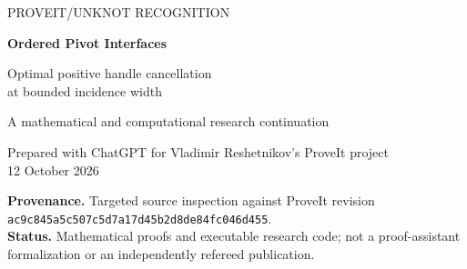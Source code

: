\documentclass[11pt,a4paper]{article}
\theoremstyle{definition}
\theoremstyle{remark}
\newcommand{\code}[1]{\nolinkurl{#1}}
\begin{document}
\begin{titlepage}
\thispagestyle{empty}
\vspace*{13mm}
{\large\sffamily PROVEIT\quad /\quad UNKNOT RECOGNITION\par}
\vspace{17mm}
{\LARGE\bfseries Ordered Pivot Interfaces\par}
\vspace{5mm}
{\Large Optimal positive handle cancellation\\at bounded incidence width\par}
\vspace{13mm}
{\large A mathematical and computational research continuation\par}
\vspace{5mm}
Prepared with ChatGPT for Vladimir Reshetnikov's ProveIt project\\
12 October 2026
\vspace{14mm}
\begin{abstract}
The existing positive-cancellation calculus can decide whether every active
row disappears by private-column peeling. Selecting the best residual set is
more difficult. We identify its weighted optimization problem with
unit-restricted uniquely restricted matching in a bipartite incidence graph
and prove an exact algorithm with running time
$\operatorname{poly}(N,B)\,2^{O(w\log(w+2))}$, given a width-$w$ tree
decomposition. A bag stores only a total order and one matching-status bit
per vertex. An order-amalgamation lemma replaces a quadratic-size
reachability relation and supplies the join proof.

We extend the ordered states to exact max-plus interfaces for repeat-safe
path templates. Binary repetition is handled in time polynomial in the
encoded repetition length, with independently checked full-table
optimality certificates. A connected family of incidence treewidth two has
full row rank, a unit maximal minor, and an optimal deferred weight growing
linearly with the number of tiles. Thus low-width optimization is useful
without implying small residual cores.

The release includes proofs, a standard-library implementation, independent
plan and transfer checkers, 52 unit tests, exhaustive comparisons on 36,901
matrices, and paired component measurements. It does not supply a general
quasi-polynomial unknot recognizer, authenticate new geometric sources, or
claim an end-to-end knot speedup.
\end{abstract}
\vfill
\noindent\textbf{Provenance.} Targeted source inspection against ProveIt revision\\
\code{ac9c845a5c507c5d7a17d45b2d8de84fc046d455}.\\[3pt]
\textbf{Status.} Mathematical proofs and executable research code; not a
proof-assistant formalization or an independently refereed publication.
\end{titlepage}
\begingroup
\fontsize{9}{10.4}\selectfont
\setlength{\parskip}{0pt}
\tableofcontents
\endgroup
\newpage
\end{document}
